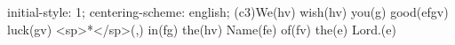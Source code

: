 initial-style: 1;
centering-scheme: english;
(c3)We(hv) wish(hv) you(g) good(efgv) luck(gv) <sp>*</sp>(,) in(fg) the(hv) Name(fe) of(fv) the(e) Lord.(e)
